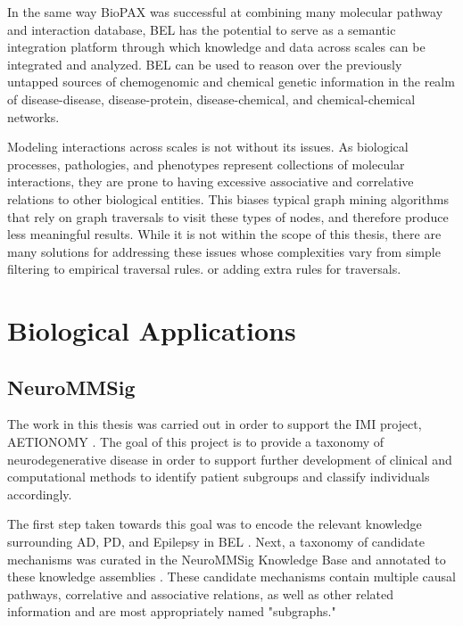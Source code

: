 In the same way \ac{BioPAX} was successful at combining many molecular pathway and interaction database, \ac{BEL} has the potential to serve as a semantic integration platform through which knowledge and data across scales can be integrated and analyzed. \ac{BEL} can be used to reason over the previously untapped sources of chemogenomic and chemical genetic information in the realm of disease-disease, disease-protein, disease-chemical, and chemical-chemical networks.

Modeling interactions across scales is not without its issues. As biological processes, pathologies, and phenotypes represent collections of molecular interactions, they are prone to having excessive associative and correlative relations to other biological entities. This biases typical graph mining algorithms that rely on  graph traversals to visit these types of nodes, and therefore produce less meaningful results. While it is not within the scope of this thesis, there are many solutions for addressing these issues whose complexities vary from simple filtering to empirical traversal rules. or adding extra rules for traversals.

\section{Biological Applications}
\label{biological_applications}

\subsection{NeuroMMSig}

The work in this thesis was carried out in order to support the \ac{IMI} \cite{imisite} project, AETIONOMY \cite{aetionomy}. The goal of this project is to provide a taxonomy of neurodegenerative disease in order to support further development of clinical and computational methods to identify patient subgroups and classify individuals accordingly. 

The first step taken towards this goal was to encode the relevant knowledge surrounding \ac{AD}, \ac{PD}, and Epilepsy in BEL \cite{Kodamullil2015}. Next, a taxonomy of candidate mechanisms was curated in the \ac{NeuroMMSig} Knowledge Base and annotated to these knowledge assemblies \cite{Domingo-Fernandez2017}. These candidate mechanisms contain multiple causal pathways, correlative and associative relations, as well as other related information and are most appropriately named "subgraphs."
